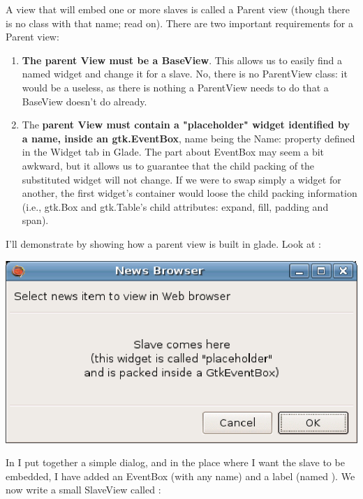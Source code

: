 \documentclass[a4paper]{howto}
\begin{document}
A view that will embed one or more slaves is called a Parent view
(though there is no class with that name; read on). There are two
important requirements for a Parent view:

\begin{enumerate}
\item {\bf The parent View must be a BaseView}. This allows us to
easily find a named widget and change it for a slave. No, there is no
ParentView class: it would be a useless, as there is nothing a
ParentView needs to do that a BaseView doesn't do already.
\item The {\bf parent View must contain a "placeholder" widget
identified by a name, inside an gtk.EventBox}, name being the Name: property
defined in the Widget tab in Glade. The part about EventBox may seem a
bit awkward, but it allows us to guarantee that the child packing of the
substituted widget will not change. If we were to swap simply a widget
for another, the first widget's container would loose the child packing
information (i.e., gtk.Box and gtk.Table's child attributes: expand, fill,
padding and span).
\end{enumerate}

I'll demonstrate by showing how a parent view is built in glade. Look at
:

\begin{center}
\includegraphics[scale=0.905]{images/shell1.eps}
\end{center}

In  I put together a simple dialog, and in the place where
I want the slave to be embedded, I have added an EventBox (with any
name) and a label (named ). We now write a
small SlaveView called :
\end{document}
